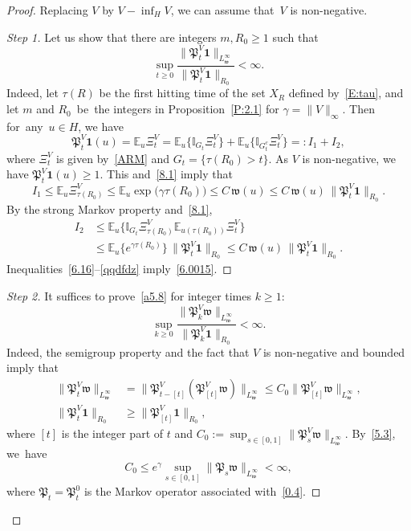 \documentclass[10pt]{amsart}
\theoremstyle{definition}\newtheorem{defi}[theo]{Definition}\newtheorem{rema}[theo]{Remark}\newtheorem{exam}[theo]{Example}\newtheorem{exem}[theo]{Example}\newtheorem{nota}[theo]{Notation}
\newcommand{\mek}{{\mathbf 1}}
\newcommand{\I}{{\mathbb I}}
\newcommand{\E}{{\mathbb E}}
\newcommand{\ty}{\infty}
\newcommand{\wwww}{{\mathfrak w}}
\newcommand{\PPPP}{{\mathfrak P}}
\newenvironment{step}{\begin{proof}}{\let\qed\relax \end{proof}}
\begin{document}
\begin{proof}
Replacing $V$ by $V-\inf_HV$, we can assume that~$V$ is non-negative.

\begin{step}[Step 1]
Let us show that there are integers $m, R_0\ge1$ such that
\begin{equation}\label{6.0015}
\sup_{t\ge0} \frac{\|\PPPP_{t}^V{\mek}\|_{L_\wwww^\infty}}{\|\PPPP_{t}^V{\mek}\|_{R_0}}<\infty.
\end{equation}
Indeed, let $\tau(R)$ be the first hitting time of the set $X_R$ defined by~\eqref{E:tau}, and let $m$ and $R_0$~be~the integers in Proposition~\ref{P:2.1} for $\gamma=\|V\|_\ty$. Then for~any~$u\in H$, we have
\begin{equation}
\PPPP_t^V{\mek}(u)=\E_u\Xi^V_t =\E_u \bigl\{\I_{G_t}\Xi^V_t \bigr\}+\E_u\bigl\{\I_{G_t^c}\Xi^V_t\bigr\}=:I_1+I_2,\label{6.16}
\end{equation}
where $\Xi^V_t$ is given by~\eqref{ARM} and $G_t=\{\tau(R_0)> t\}$. As $V$ is non-negative, we have $\PPPP_t^V{\mek}(u)\ge1$. This and~\eqref{8.1} imply that
\begin{equation}\label{sdqsd}
I_1\le \E_u \Xi^V_{\tau(R_0)} \le \E_u\exp\bigl(\gamma\tau(R_0)\bigr)\le C\,\wwww(u)
\le C\,\wwww(u)\,\|\PPPP_t^V{\mek}\|_{R_0}.
\end{equation}
By the strong Markov property and~\eqref{8.1},
\begin{align}
I_2&\le \E_u\bigl\{\I_{G_t}\Xi^V_{\tau(R_0)}\E_{u(\tau(R_0))}\Xi^V_t\bigr\}
\nonumber\\&\le\E_u \{e^{\gamma\tau(R_0)} \}\,\|\PPPP_t^V{\mek}\|_{R_0} \le C\,\wwww(u)\,\|\PPPP_t^V{\mek}\|_{R_0}.\label{qqdfdz}
\end{align}
Inequalities~\eqref{6.16}--\eqref{qqdfdz} imply~\eqref{6.0015}.
\end{step}

\begin{step}[Step 2]
It suffices to prove~\eqref{a5.8} for integer times $k\ge1$:
\begin{equation}
\sup_{k\ge0}
\frac{\|\PPPP_k^V\wwww\|_{L_{\wwww}^\infty}}{\|\PPPP_k^V{\mek}\|_{R_0}}<\infty.\label{a5.8b}
\end{equation}
Indeed, the semigroup property and the fact that $V$ is non-negative and bounded imply that
\begin{align*}
\|\PPPP^V_t\wwww\|_{L_\wwww^\infty} &=\|\PPPP^V_{t-[t]}(\PPPP^V_{[t]}\wwww)\|_{L_\wwww^\infty} \le C_0\|\PPPP^V_{[t] }\wwww\|_{L_\wwww^\infty},\\
\|\PPPP_t^V{\mek}\|_{R_0}&\ge\|\PPPP_{[t]}^V{\mek}\|_{R_0},
\end{align*}
where $[t]$ is the integer part of $t$ and $ C_0:=\sup_{s\in[0,1]}\|\PPPP^V_s\wwww\|_{L_\wwww^\infty}.$ By~\eqref{5.3}, we~have
\[
C_0 \le e^{\gamma} \sup_{s\in[0,1]}\|\PPPP_s\wwww\|_{L_\wwww^\infty}<\ty,
\]
where $\PPPP_t=\PPPP_t^0$ is the Markov operator associated with~\eqref{0.4}.
\end{step}


\end{proof}
\end{document}
